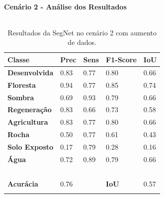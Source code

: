 \documentclass[%
  10pt,%
  aspectratio = 169,%
  compress,%
  t,%
  english,%
  brazilian,%
  tikz,
]{beamer}
\begin{document}
\begin{frame}
\framesubtitle{Cenário 2 - Análise dos Resultados}

\begin{columns}[T]

\begin{table}[!ht]
    \centering
    \caption{Resultados da SegNet no cenário 2 com aumento de dados.}%
    \label{tab:res:cen12}%
    \begin{tabular}{lllll}
    \toprule
        \textbf{Classe} & \textbf{Prec} & \textbf{Sens} & \textbf{F1-Score} & \textbf{IoU} \\
        \midrule
        \textbf{Desenvolvida} & 0.83 & 0.77 & 0.80 & 0.66  \\ 
        \textbf{Floresta} & 0.94 & 0.77 & 0.85 & 0.74  \\ 
        \textbf{Sombra} & 0.69 & 0.93 & 0.79 & 0.66  \\ 
        \textbf{Regeneração} & 0.83 & 0.66 & 0.73 & 0.58  \\ 
        \textbf{Agricultura} & 0.83 & 0.77 & 0.80 & 0.66  \\ 
        \textbf{Rocha} & 0.50 & 0.77 & 0.61 & 0.43 \\ 
        \textbf{Solo Exposto} & 0.17 & 0.79 & 0.28 & 0.16 \\ 
        \textbf{Água} & 0.72 & 0.89 & 0.79 & 0.66 \\ 
        \textbf{} & ~ & ~ & ~ & ~ \\ 
        \textbf{Acurácia} & 0.76 & ~ & \textbf{IoU} & 0.57 \\
        \bottomrule
        \addlinespace
    \end{tabular}
\end{table}



\end{columns}
\end{frame}
\end{document}
